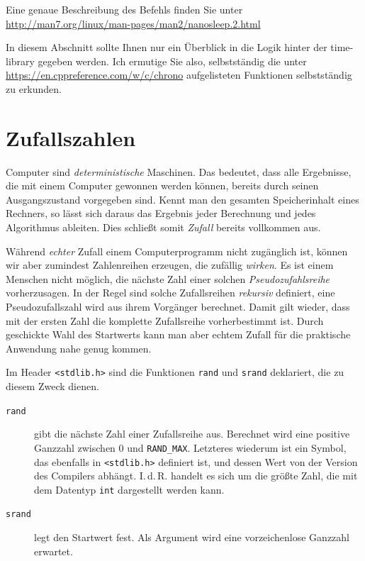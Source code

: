 Eine genaue Beschreibung des Befehls finden Sie unter \url{http://man7.org/linux/man-pages/man2/nanosleep.2.html}

\begin{hintbox}
In diesem Abschnitt sollte Ihnen nur ein Überblick in die Logik hinter der time-library gegeben werden. Ich ermutige Sie also, selbstständig die unter \url{https://en.cppreference.com/w/c/chrono} aufgelisteten Funktionen selbstständig zu erkunden.
\end{hintbox}

\section{Zufallszahlen} \label{sec:RandomNums}
Computer sind \emph{deterministische} Maschinen. Das bedeutet, dass alle Ergebnisse, die mit einem Computer gewonnen werden können, bereits durch seinen Ausgangszustand vorgegeben sind. Kennt man den gesamten Speicherinhalt eines Rechners, so lässt sich daraus das Ergebnis jeder Berechnung und jedes Algorithmus ableiten. Dies schließt somit \emph{Zufall} bereits vollkommen aus.

Während \emph{echter} Zufall einem Computerprogramm nicht zugänglich ist, können wir aber zumindest Zahlenreihen erzeugen, die zufällig \emph{wirken}. Es ist einem Menschen \idR nicht möglich, die nächste Zahl einer solchen \emph{Pseudozufahlsreihe} vorherzusagen. In der Regel sind solche Zufallsreihen \emph{rekursiv} definiert, \ie eine Pseudozufallszahl wird aus ihrem Vorgänger berechnet. Damit gilt wieder, dass mit der ersten Zahl die komplette Zufallsreihe vorherbestimmt ist. Durch geschickte Wahl des Startwerts kann man aber echtem Zufall für die praktische Anwendung nahe genug kommen.

Im Header \texttt{<stdlib.h>} sind die Funktionen \texttt{rand} und \texttt{srand} deklariert, die zu diesem Zweck dienen. 
\begin{description}
\item[\texttt{rand}] gibt die nächste Zahl einer Zufallsreihe aus. Berechnet wird eine positive Ganzzahl zwischen 0 und \texttt{RAND\_MAX}. Letzteres wiederum ist ein Symbol, das ebenfalls in \texttt{<stdlib.h>} definiert ist, und dessen Wert von der Version des Compilers abhängt. I.\,d.\,R. handelt es sich um die größte Zahl, die mit dem Datentyp \texttt{int} dargestellt werden kann.
\item[\texttt{srand}] legt den Startwert fest. Als Argument wird eine vorzeichenlose Ganzzahl erwartet.
\end{description}

